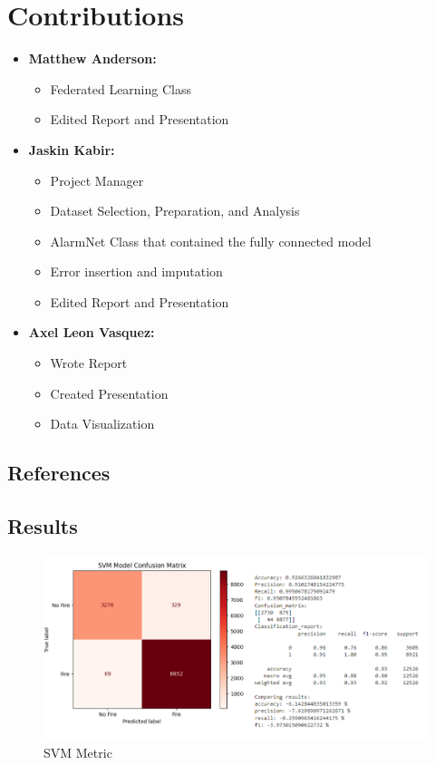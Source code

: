 \documentclass[conference]{IEEEtran}
\begin{document}
\section{Contributions}
\begin{itemize}
\item\textbf{Matthew Anderson:} 
\begin{itemize}
    \item Federated Learning Class
    \item Edited Report and Presentation
\end{itemize}

\item\textbf{Jaskin Kabir:} 
\begin{itemize}
    \item Project Manager
    \item Dataset Selection, Preparation, and Analysis
    \item AlarmNet Class that contained the fully connected
    model
    \item Error insertion and imputation
    \item Edited Report and Presentation
\end{itemize}

\item\textbf{Axel Leon Vasquez:} 
\begin{itemize}
    \item Wrote Report
    \item Created Presentation
    \item Data Visualization
\end{itemize}
\end{itemize}
\subsection{References}






\subsection{Results} 

\begin{figure}
    \centering
    \includegraphics[width=0.75\linewidth]{images/SVM.png}
    \caption{SVM Metric}
    \label{fig: SVM Model}
\end{figure}
\end{document}
